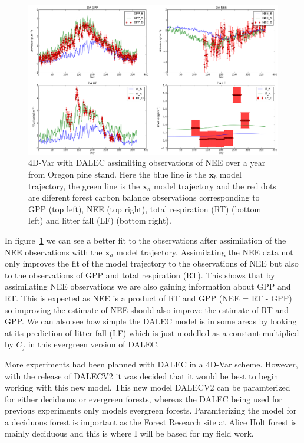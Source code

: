 \documentclass[11pt]{article}
\begin{document}
\begin{figure}[ht]
\centering
\includegraphics[height=.55\textwidth, ]{dacodeneeonly.png}
\caption{4D-Var with DALEC assimilting observations of NEE over a year from Oregon pine stand. Here the blue line is the $\textbf{x}_b$ model trajectory, the green line is the $\textbf{x}_a$ model trajectory and the red dots are diferent forest carbon balance observations corresponding to GPP (top left), NEE (top right), total respiration (RT) (bottom left) and litter fall (LF) (bottom right).}
\label{4dvardalec}
\end{figure}
In figure~\ref{4dvardalec} we can see a better fit to the observations after assimilation of the NEE observations with the $\textbf{x}_a$ model trajectory. Assimilating the NEE data not only improves the fit of the model trajectory to the observations of NEE but also to the observations of GPP and total respiration (RT). This shows that by assimilating NEE observations we are also gaining information about GPP and RT. This is expected as NEE is a product of RT and GPP (NEE = RT - GPP) so improving the estimate of NEE should also improve the estimate of RT and GPP. We can also see how simple the DALEC model is in some areas by looking at its prediction of litter fall (LF) which is just modelled as a constant multiplied by $C_f$ in this evergreen version of DALEC.

More experiments had been planned with DALEC in a 4D-Var scheme. However, with the release of DALECV2 \cite{Bloom2014} it was decided that it would be best to begin working with this new model. This new model DALECV2 can be paramterized for either deciduous or evergreen forests, whereas the DALEC being used for previous experiments only models evergreen forests. Paramterizing the model for a deciduous forest is important as the Forest Research site at Alice Holt forest is mainly deciduous and this is where I will be based for my field work.
\newpage
\end{document}
